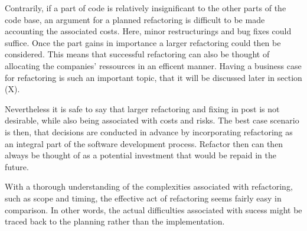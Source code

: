 Contrarily, 
	if a part of code is relatively insignificant 
	to the other parts of the code base, 
	an argument for a planned refactoring is difficult 
	to be made accounting the associated costs. 
Here, minor restructurings and bug fixes could suffice. 
Once the part gains in importance 
	a larger refactoring could then be considered. 
This means that successful refactoring can also be thought of 
	allocating the companies' ressources in an efficent manner. 
Having a business case for refactoring is such an important topic, 
	that it will be discussed later in section (X).

Nevertheless it is safe to say 
	that larger refactoring and fixing in post is not desirable, 
	while also being associated with costs and risks. 
The best case scenario is then, 
	that decisions are conducted in advance 
	by incorporating refactoring as an integral part 
	of the software development process.
Refactor then can then always be thought of as a 
	potential investment that would be repaid in the future. 






With a thorough understanding of the complexities 
	associated with refactoring, 
	such as scope and timing, 
	the effective act of refactoring seems fairly easy in comparison. 
In other words, 
	the actual difficulties associated with sucess 
	might be traced back to the planning rather than the implementation. 


